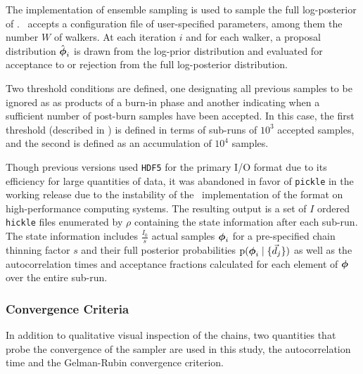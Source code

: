 The \emcee \citep{Foreman-Mackey2013} implementation of ensemble sampling is used to sample the full log-posterior of . 
\chippr\ accepts a configuration file of user-specified parameters, among them the number $W$ of walkers.
At each iteration $i$ and for each walker, a proposal distribution $\hat{{\boldsymbol{\phi}}}_{i}$ is drawn from the log-prior distribution and evaluated for acceptance to or rejection from the full log-posterior distribution.

Two threshold conditions are defined, one designating all previous samples to be ignored as as products of a burn-in phase and another indicating when a sufficient number of post-burn samples have been accepted.  
In this case, the first threshold (described in ) is defined in terms of sub-runs of $10^{3}$ accepted samples, and the second is defined as an accumulation of $10^{4}$ samples.

Though previous versions used \texttt{HDF5} for the primary I/O format due to its efficiency for large quantities of data, it was abandoned in favor of \texttt{pickle} in the working release due to the instability of the \python\ implementation of the format on high-performance computing systems.  
The resulting output is a set of $I$ ordered \texttt{hickle} files enumerated by $\rho$ containing the state information after each sub-run.  
The state information includes $\frac{I_{0}}{s}$ actual samples ${\boldsymbol{\phi}}_{i}$ for a pre-specified chain thinning factor $s$ and their full posterior probabilities $\mathrm{p}({\boldsymbol{\phi}}_{i} \mid \{\vec{d}_{j}\})$ as well as the autocorrelation times and acceptance fractions calculated for each element of ${\boldsymbol{\phi}}$ over the entire sub-run.  

\subsubsection{Convergence Criteria}

In addition to qualitative visual inspection of the chains, two quantities that probe the convergence of the sampler are used in this study, the autocorrelation time and the Gelman-Rubin convergence criterion.  



